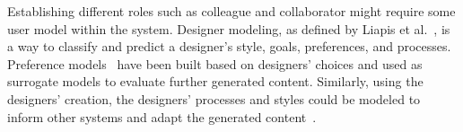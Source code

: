 
Establishing different roles such as colleague and collaborator might require some user model within the system. Designer modeling, as defined by Liapis et al.~\cite{p13liapis_designer_2013}, is a way to classify and predict a designer's style, goals, preferences, and processes. Preference models~\cite{p13alvarez_learning_2020,liapis_adapting_2012} have been built based on designers' choices and used as surrogate models to evaluate further generated content. Similarly, using the designers' creation, the designers' processes and styles could be modeled to inform other systems and adapt the generated content~\cite{p13liapis_designer_2014,alvarez_designer_2022,halina_threshold_2022}.











